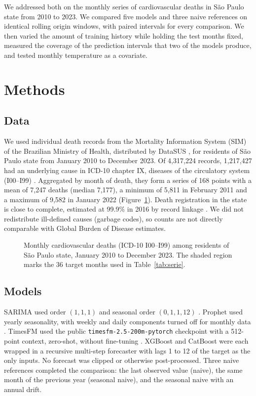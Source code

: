 We addressed both on the monthly series of cardiovascular deaths in S\~ao Paulo state from
2010 to 2023. We compared five models and three naive references on identical rolling
origin windows, with paired intervals for every comparison. We then varied the amount of
training history while holding the test months fixed, measured the coverage of the
prediction intervals that two of the models produce, and tested monthly temperature as a
covariate.

\section{Methods}\label{sec:metodos}

\subsection{Data}

We used individual death records from the Mortality Information System (SIM) of the
Brazilian Ministry of Health, distributed by DataSUS \citep{datasus}, for residents of S\~ao
Paulo state from January 2010 to December 2023. Of 4{,}317{,}224 records, 1{,}217{,}427 had
an underlying cause in ICD-10 chapter IX, diseases of the circulatory system (I00--I99)
\citep{icd10}. Aggregated by month of death, they form a series of 168 points with a mean of
7{,}247 deaths (median 7{,}177), a minimum of 5{,}811 in February 2011 and a maximum of
9{,}582 in January 2022 (Figure~\ref{fig:serie}). Death registration in the state is close
to complete, estimated at 99.9\% in 2016 by record linkage \citep{costa2020}. We did not
redistribute ill-defined causes (garbage codes), so counts are not directly comparable with
Global Burden of Disease estimates.

\begin{figure}[htbp]
\centering

\caption{Monthly cardiovascular deaths (ICD-10 I00--I99) among residents of S\~ao Paulo
state, January 2010 to December 2023. The shaded region marks the 36 target months used in
Table~\ref{tab:serie}.}
\label{fig:serie}
\end{figure}

\subsection{Models}

SARIMA used order $(1,1,1)$ and seasonal order $(0,1,1,12)$ \citep{box2015}. Prophet used
yearly seasonality, with weekly and daily components turned off for monthly data
\citep{taylor2018}. TimesFM used the public \texttt{timesfm-2.5-200m-pytorch} checkpoint with
a 512-point context, zero-shot, without fine-tuning \citep{das2024}. XGBoost
\citep{chen2016} and CatBoost \citep{prokhorenkova2018} were each wrapped in a recursive
multi-step forecaster with lags 1 to 12 of the target as the only inputs. No forecast was
clipped or otherwise post-processed. Three naive references completed the comparison: the
last observed value (naive), the same month of the previous year (seasonal naive), and the
seasonal naive with an annual drift.


